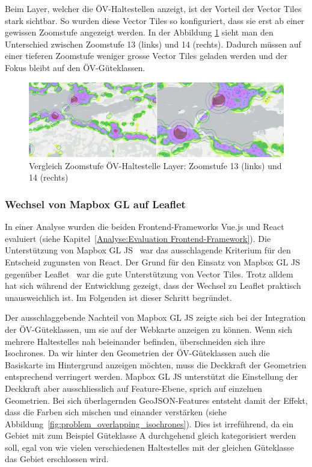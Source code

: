 Beim Layer, welcher die ÖV-Haltestellen anzeigt, ist der Vorteil der Vector Tiles stark sichtbar.
So wurden diese Vector Tiles so konfiguriert, dass sie erst ab einer gewissen Zoomstufe angezeigt werden. In der Abbildung \ref{fig:zoom-level-comparison} sieht man den Unterschied zwischen Zoomstufe 13 (links) und 14 (rechts).
Dadurch müssen auf einer tieferen Zoomstufe weniger grosse Vector Tiles geladen werden und der Fokus bleibt auf den \gls{ÖV-Güteklassen}.

\begin{figure}[ht]
    \centering
    \includegraphics[width=1.0\linewidth]{projectdoc/img/zoom-level-comparison.png}
    \caption[Vergleich Zoom-Stufe ÖV-Haltestelle Layer]{Vergleich Zoomstufe ÖV-\gls{Haltestelle} Layer: Zoomstufe 13 (links) und 14 (rechts)}
    \label{fig:zoom-level-comparison}
\end{figure}


\subsubsection{Wechsel von Mapbox GL auf Leaflet}

In einer Analyse wurden die beiden Frontend-Frameworks Vue.js und React evaluiert (siehe Kapitel~\ref{Analyse:Evaluation Frontend-Framework}).
Die Unterstützung von Mapbox GL JS~\cite{mapbox_gl_js} war das ausschlagende Kriterium für den Entscheid zugunsten von React.
Der Grund für den Einsatz von Mapbox GL JS gegenüber Leaflet~\cite{leaflet} war die gute Unterstützung von Vector Tiles.
Trotz alldem hat sich während der Entwicklung gezeigt, dass der Wechsel zu Leaflet praktisch unausweichlich ist.
Im Folgenden ist dieser Schritt begründet.

Der ausschlaggebende Nachteil von Mapbox GL JS zeigte sich bei der Integration der \gls{ÖV-Güteklassen}, um sie auf der Webkarte anzeigen zu können.
Wenn sich mehrere \glspl{Haltestelle} nah beieinander befinden, überschneiden sich ihre \glspl{Isochrone}.
Da wir hinter den Geometrien der \gls{ÖV-Güteklassen} auch die Basiskarte im Hintergrund anzeigen möchten, muss die Deckkraft der Geometrien entsprechend verringert werden.
Mapbox GL JS unterstützt die Einstellung der Deckkraft aber ausschliesslich auf Feature-Ebene, sprich auf einzelnen Geometrien.
Bei sich überlagernden \glspl{GeoJSON-Feature} entsteht damit der Effekt, dass die Farben sich mischen und einander verstärken (siehe Abbildung~\ref{fig:problem_overlapping_isochrones}).
Dies ist irreführend, da ein Gebiet mit zum Beispiel Güteklasse A durchgehend gleich kategorisiert werden soll, egal von wie vielen verschiedenen \glspl{Haltestelle} mit der gleichen Güteklasse das Gebiet erschlossen wird.


